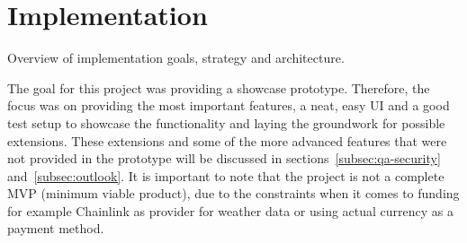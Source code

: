 \documentclass[11pt,a4paper]{article}
\begin{document}
		\section{Implementation}\label{sec:implementation}
		Overview of implementation goals, strategy and architecture.

		The goal for this project was providing a showcase prototype.
		Therefore, the focus was on providing the most important features, a neat, easy UI and a good test setup to showcase the functionality and laying the groundwork for possible extensions.
		These extensions and some of the more advanced features that were not provided in the prototype will be discussed in sections~\ref{subsec:qa-security} and~\ref{subsec:outlook}.
		It is important to note that the project is not a complete MVP (minimum viable product), due to the constraints when it comes to funding for example Chainlink as provider for weather data or using actual currency as a payment method.

\end{document}
